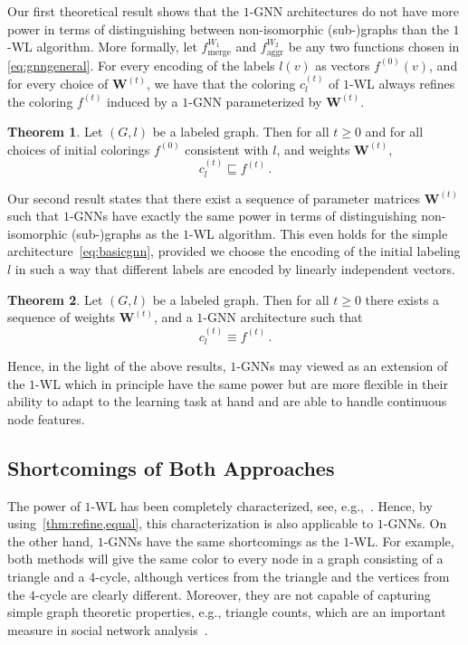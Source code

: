 \documentclass[letterpaper]{article}
\theoremstyle{definition}
\newtheorem{theorem}{Theorem}
\begin{document}
Our first theoretical result shows that the $1$-GNN architectures do not have more power in terms of distinguishing between non-isomorphic (sub-)graphs than the $1$-WL algorithm.
More formally, let $f^{W_1}_{\text{merge}}$ and $f^{W_2}_{\text{aggr}}$ be any two functions chosen in \eqref{eq:gnngeneral}.
For every encoding of the labels $l(v)$ as vectors $f^{(0)}(v)$, and for every choice of $\mathbf{W}^{(t)}$, we have that the coloring $c^{(t)}_l$ of $1$-WL always refines the coloring $f^{(t)}$ induced by a $1$-GNN parameterized by $\mathbf{W}^{(t)}$.

\begin{theorem}\label{thm:refine}
	Let $(G, l)$ be a labeled graph. Then for all $t\ge 0$ and for all choices of initial colorings $f^{(0)}$ consistent with $l$, and weights $\mathbf{W}^{(t)}$,
	\begin{equation*}
		c^{(t)}_l \sqsubseteq f^{(t)}\,.
	\end{equation*}
\end{theorem}

Our second result states that there exist a sequence of parameter matrices $\mathbf{W}^{(t)}$ such that $1$-GNNs have exactly the same power in terms of distinguishing non-isomorphic \mbox{(sub-)}graphs as the $1$-WL algorithm.
This even holds for the simple architecture~\eqref{eq:basicgnn}, provided we choose the encoding of the initial labeling $l$ in such a way that different labels are encoded by linearly independent vectors.

\begin{theorem}\label{equal}
	Let $(G, l)$ be a labeled graph. Then for all \mbox{$t\geq 0$} there exists a sequence of weights $\mathbf{W}^{(t)}$, and a $1$-GNN architecture such that 
	\begin{equation*}
		c^{(t)}_l \equiv f^{(t)}\,.
	\end{equation*}
\end{theorem}

Hence, in the light of the above results, $1$-GNNs may viewed as an extension of the $1$-WL which in principle have the same power but are more flexible in their ability to adapt to the learning task at hand and are able to handle continuous node features.

\subsection{Shortcomings of Both Approaches}

The power of $1$-WL has been completely characterized, see, e.g.,~\cite{Arv+2015}.  
Hence, by using~\cref{thm:refine,equal}, this characterization is also applicable to $1$-GNNs. 
On the other hand, $1$-GNNs have the same shortcomings as the $1$-WL. 
For example, both methods will give the same color to every node in a graph consisting of a triangle and a $4$-cycle, although vertices from the triangle and the vertices from the $4$-cycle are clearly different.
Moreover, they are not capable of capturing simple graph theoretic properties, e.g., triangle counts, which are an important measure in social network analysis~\cite{Mil+2002,New2003}.
\end{document}
